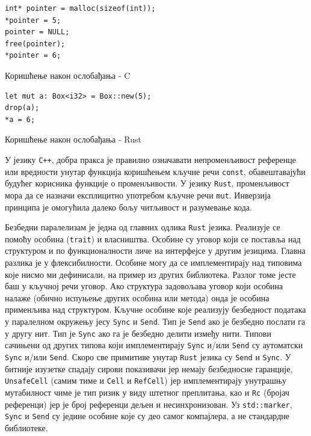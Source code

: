\begin{multicols}{2}
    \begin{listing}[H]
    \begin{verbatim}
int* pointer = malloc(sizeof(int));
*pointer = 5;
pointer = NULL;
free(pointer);
*pointer = 6; 
    \end{verbatim}
    \caption{Коришћење након ослобађања - C}
    \label{lst:use_after_free_c}
    \end{listing}
    \columnbreak
    \begin{listing}[H]
    \begin{verbatim}
let mut a: Box<i32> = Box::new(5);
drop(a);
*a = 6;
    \end{verbatim}
    \caption{Коришћење након ослобађања - Rust}
    \label{lst:user_after_free_rust}
    \end{listing}
\end{multicols}

У језику \verb|C++|, добра пракса је правилно означавати непроменљивост референце или вредности
унутар функција коришћењем кључне речи \verb|const|, обавештавајући будућег корисника функције 
о променљивости. У језику \verb|Rust|, променљивост мора да се назначи експлицитно употребом кључне 
речи \verb|mut|. Инверзија принципа је омогућила далеко бољу читљивост и разумевање кода.

Безбедни паралелизам је једна од главних одлика \verb|Rust| језика. Реализује се помоћу особина (\verb|trait|)
и власништва. Особине су уговор који се поставља над структуром и по функционалности личе на интерфејсе
у другим језицима. Главна разлика је у флексибилности. Особине могу да се имплементирају над типовима
које нисмо ми дефинисали, на пример из других библиотека. Разлог томе јесте баш у кључној речи уговор.
Ако структура задовољава уговор који особина налаже (обично испуњење других особина или
метода) онда је особина применљива над структуром. Кључне особине које реализују безбедност података
у паралелном окружењу јесу \verb|Sync| и \verb|Send|. Тип је \verb|Send| ако је безбедно послати га 
у другу нит. Тип је \verb|Sync| ако га је безбедно делити између нити. Типови сачињени од других типова који
имплементирају \verb|Sync| и/или \verb|Send| су аутоматски \verb|Sync| и/или \verb|Send|. Скоро све примитиве
унутар \verb|Rust| језика су \verb|Send| и \verb|Sync|. У битније изузетке спадају сирови показивачи јер немају
безбедносне гаранције, \verb|UnsafeCell| (самим тиме и \verb|Cell| и \verb|RefCell|) јер имплементирају
унутрашњу мутабилност чиме је тип ризик у виду штетног преплитања, као и \verb|Rc| (бројач референци) 
јер је број референци дељен и несинхронизован. Уз \verb|std::marker|, \verb|Sync| и \verb|Send| су једине особине које су 
део самог компајлера, а не стандардне библиотеке.

